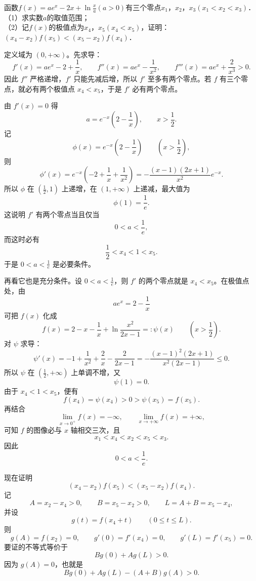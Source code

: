 \begin{example}[零点与极值题]
    函数$f(x)=ae^{x}-2x+\ln \frac{x}{a}(a>0)$有三个零点$x_{1}$，$x_{2}$，$x_{3}(x_{1}<x_{2}<x_{3})$．  \\
（1）求实数$a$的取值范围；  \\
（2）记$f(x)$的极值点为$x_{4}$，$x_{5}(x_{4}<x_{5})$，证明：$(x_{4}-x_{2})f(x_{5})<(x_{5}-x_{2})f(x_{4})$．
\end{example}
\begin{solution}
定义域为 $(0,+\infty)$。先求导：
\[
f'(x)=ae^x-2+\frac1x,\qquad
f''(x)=ae^x-\frac1{x^2},\qquad
f'''(x)=ae^x+\frac2{x^3}>0.
\]
因此 $f''$ 严格递增，$f'$ 只能先减后增，所以 $f'$ 至多有两个零点。若 $f$ 有三个零点，就必有两个极值点 $x_4<x_5$，于是 $f'$ 必有两个零点。

由 $f'(x)=0$ 得
\[
a=e^{-x}\left(2-\frac1x\right),\qquad x>\frac12.
\]
记
\[
\phi(x)=e^{-x}\left(2-\frac1x\right)\qquad \left(x>\frac12\right),
\]
则
\[
\phi'(x)=e^{-x}\left(-2+\frac1x+\frac1{x^2}\right)
=-\frac{(x-1)(2x+1)}{x^2}e^{-x}.
\]
所以 $\phi$ 在 $(\frac12,1)$ 上递增，在 $(1,+\infty)$ 上递减，最大值为
\[
\phi(1)=\frac1e.
\]
这说明 $f'$ 有两个零点当且仅当
\[
0<a<\frac1e,
\]
而这时必有
\[
\frac12<x_4<1<x_5.
\]
于是 $0<a<\frac1e$ 是必要条件。

再看它也是充分条件。设 $0<a<\frac1e$，则 $f'$ 的两个零点就是 $x_4<x_5$。在极值点处，由
\[
ae^x=2-\frac1x
\]
可把 $f(x)$ 化成
\[
f(x)=2-x-\frac1x+\ln\frac{x^2}{2x-1}=: \psi(x)\qquad \left(x>\frac12\right).
\]
对 $\psi$ 求导：
\[
\psi'(x)
=-1+\frac1{x^2}+\frac2x-\frac2{2x-1}
=-\frac{(x-1)^2(2x+1)}{x^2(2x-1)}\le 0.
\]
所以 $\psi$ 在 $(\frac12,+\infty)$ 上单调不增，又
\[
\psi(1)=0.
\]
由于 $x_4<1<x_5$，便有
\[
f(x_4)=\psi(x_4)>0>\psi(x_5)=f(x_5).
\]
再结合
\[
\lim_{x\to0^+}f(x)=-\infty,\qquad \lim_{x\to+\infty}f(x)=+\infty,
\]
可知 $f$ 的图像必与 $x$ 轴相交三次，且
\[
x_1<x_4<x_2<x_5<x_3.
\]
因此
\[
0<a<\frac1e.
\]

现在证明
\[
(x_4-x_2)f(x_5)<(x_5-x_2)f(x_4).
\]
记
\[
A=x_2-x_4>0,\qquad B=x_5-x_2>0,\qquad L=A+B=x_5-x_4,
\]
并设
\[
g(t)=f(x_4+t)\qquad (0\le t\le L).
\]
则
\[
g(A)=f(x_2)=0,\qquad g'(0)=f'(x_4)=0,\qquad g'(L)=f'(x_5)=0.
\]
要证的不等式等价于
\[
Bg(0)+Ag(L)>0.
\]
因为 $g(A)=0$，也就是
\[
Bg(0)+Ag(L)-(A+B)g(A)>0.
\]


\end{solution}
